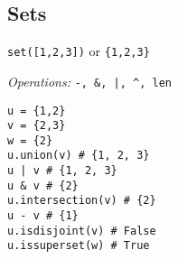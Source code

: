 \subsection{Sets}
\texttt{set([1,2,3])}  or \texttt{\{1,2,3\}}

\textit{Operations:} \texttt{-, \&, |, \textasciicircum, len}
\begin{lstlisting}
u = {1,2}
v = {2,3}
w = {2}
u.union(v) # {1, 2, 3}
u | v # {1, 2, 3}
u & v # {2}
u.intersection(v) # {2}
u - v # {1}
u.isdisjoint(v) # False
u.issuperset(w) # True
\end{lstlisting}
